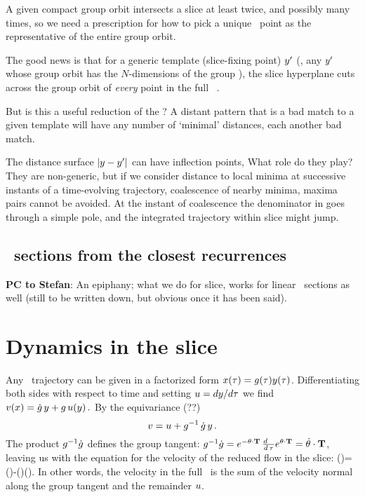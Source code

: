 A given compact group orbit intersects a slice at least twice, and
possibly many times, so we need a prescription for how to
pick a unique \reducedsp\ point as the representative of the entire group
orbit.


The good news is that for a generic template (slice-fixing point)
${y'}$ (\ie, any ${y'}$ whose group orbit has the $N$-dimensions
of the group \Group), the
slice hyperplane  cuts across the group orbit of {\em
every} point in the full \statesp\ \pS.

But is this a useful reduction of the \statesp? A distant pattern
that is a bad match to a given template will have any number of
`minimal' distances, each another bad match.




The distance surface $|y - {y'}|$ can have inflection points,
What role do they play? They are non-generic, but if we consider distance
to local minima at successive instants of a time-evolving trajectory,
coalescence of
nearby minima, maxima pairs cannot be avoided. At the instant of
coalescence the denominator in  goes through a simple
pole, and the integrated trajectory within slice might jump.



\ifboyscout
\subsection{\Poincare\ sections from the closest recurrences}
    {\color{red} {\bf PC to Stefan}:
An epiphany; what we do for slice, works for linear \Poincare\ sections
as well (still to be written down, but obvious once it has been said).
   }
\else
\fi

\subsubsection{}


\section{Dynamics in the slice}
\label{sect:MovFrameODE}

Any \statesp\ trajectory can be given in a factorized
form $x(\tau)=g(\tau)
y(\tau)$. Differentiating both sides with respect to time and
setting $u={dy}/{d\tau}$ we find
\(
v(x)=\dot{g} \, y+g \, u(y)
\,.
\)
By the equivariance (??)
\[
v=u + g^{-1} \, \dot{g} \, y
\,.
\]
The product $g^{-1}\dot{g}$ defines
the group tangent:
$g^{-1}\dot{g}=e^{-{\bf \theta} \cdot \mathbf{T}} \,
\frac{d ~~}{d \, \tau} e^{{\bf \theta} \cdot \mathbf{T}}=\dot{{\bf \theta}}\cdot \mathbf{T}$,
leaving us with the equation for the velocity of the reduced flow in the slice:
\beq
\velRed(\sspRed)=\vel(\sspRed)-\dot{\gSpace}(\sspRed)\cdot \groupTan(\sspRed).
In other words, the velocity in the full \statesp\ is the sum of the
velocity normal along the group tangent and the remainder $u$.

